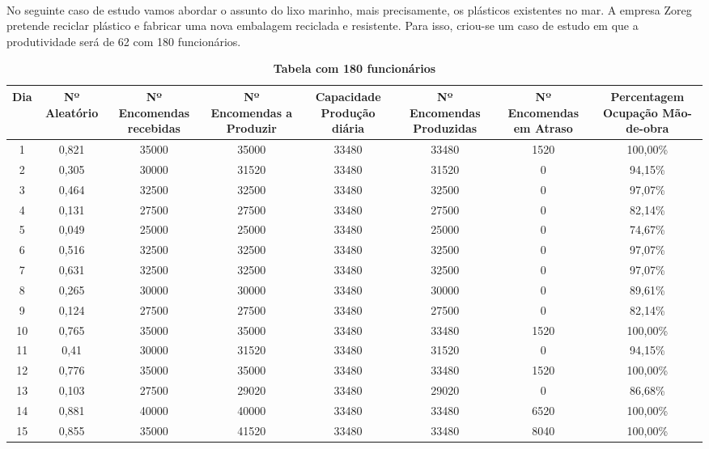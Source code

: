 \documentclass[11pt,a4paper]{report}
\begin{document}
\paragraph{}
No seguinte caso de estudo vamos abordar o assunto do lixo marinho, mais precisamente, os plásticos existentes no mar. A empresa Zoreg pretende reciclar plástico e fabricar uma nova embalagem reciclada e resistente. Para isso, criou-se um caso de estudo em que a produtividade será de 62 com 180 funcionários.
\begin{table} [h]
\begin{center}
\caption{\bf Tabela com 180 funcionários}
\begin{adjustbox}{width=1\textwidth,max totalheight=\textheight,keepaspectratio}
\begin{tabular} {|c|c|c|c|c|c|c|c|}
\hline 
Dia	& Nº Aleatório & Nº Encomendas recebidas &	Nº Encomendas a Produzir &	Capacidade Produção diária &	Nº Encomendas Produzidas &	Nº Encomendas em Atraso &	Percentagem Ocupação Mão-de-obra \\ 
\hline 
1 &	0,821 &	35000 &	35000 &	33480 &	33480 &	1520 &	100,00\%\\ \hline 
2 &	0,305 &	30000 &	31520 &	33480 &	31520 &	0 &	94,15\%\\ \hline
3 &	0,464 &	32500 &	32500 &	33480 &	32500 &	0 &	97,07\%\\ \hline
4 &	0,131 &	27500 &	27500 &	33480 &	27500 &	0 &	82,14\%\\ \hline
5 &	0,049 &	25000 &	25000 &	33480 &	25000 &	0 &	74,67\%\\ \hline
6 &	0,516 &	32500 &	32500 &	33480 &	32500 &	0 &	97,07\%\\ \hline
7 &	0,631 &	32500 &	32500 &	33480 &	32500 &	0 &	97,07\%\\ \hline
8 &	0,265 &	30000 &	30000 &	33480 &	30000 &	0 &	89,61\%\\ \hline
9 &	0,124 &	27500 &	27500 &	33480 &	27500 &	0 &	82,14\%\\ \hline
10 &	0,765 &	35000 &	35000 &	33480 &	33480 &	1520 &	100,00\%\\ \hline
11 &	0,41 &	30000 &	31520 &	33480 &	31520 &	0 &	94,15\%\\ \hline
12 &	0,776 &	35000 &	35000 &	33480 &	33480 &	1520 &	100,00\%\\ \hline
13 &	0,103 &	27500 &	29020 &	33480 &	29020 &	0 &	86,68\%\\ \hline
14 &	0,881 &	40000 &	40000 &	33480 &	33480 &	6520 &	100,00\%\\ \hline
15 &	0,855 &	35000 &	41520 &	33480 &	33480 &	8040 &	100,00\%\\ \hline

\end{tabular}
\end{adjustbox}
\end{center}
\end{table}
\end{document}
